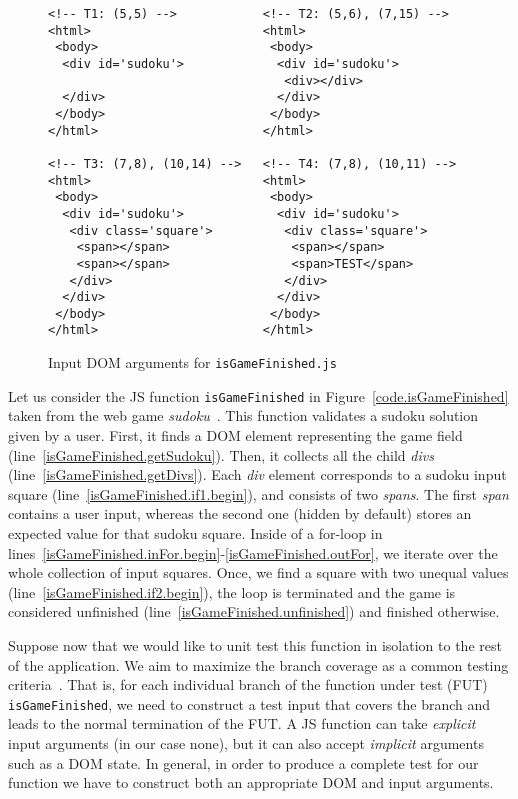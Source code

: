 \documentclass[sigconf,review]{acmart}
\begin{document}
\begin{figure}[t]
  \begin{lstlisting}[style=htmlcssjs, language=HTML5]
<!-- T1: (5,5) -->            <!-- T2: (5,6), (7,15) -->
<html>                        <html>
 <body>                        <body>
  <div id='sudoku'>             <div id='sudoku'>
                                 <div></div>                           
  </div>                        </div> 
 </body>                       </body>    
</html>                       </html>  

<!-- T3: (7,8), (10,14) -->   <!-- T4: (7,8), (10,11) -->
<html>                        <html>
 <body>                        <body>
  <div id='sudoku'>             <div id='sudoku'>
   <div class='square'>          <div class='square'>
    <span></span>                 <span></span> 
    <span></span>                 <span>TEST</span>
   </div>                        </div> 
  </div>                        </div>
 </body>                       </body>
</html>                       </html>
  \end{lstlisting}
  \caption{Input DOM arguments for \texttt{isGameFinished.js}}
  \label{fig.isGameFinished.tests}
\end{figure}

Let us consider the JS function \texttt{isGameFinished} in Figure~\ref{code.isGameFinished} taken from the web game \emph{sudoku}~\cite{sudoku}. This function validates a sudoku solution given by a user. First, it finds a DOM element representing the game field (line~\ref{isGameFinished.getSudoku}). Then, it collects all the child \emph{divs} (line~\ref{isGameFinished.getDivs}). Each \emph{div} element corresponds to a sudoku input square (line~\ref{isGameFinished.if1.begin}), and consists of two \emph{spans}. The first \emph{span} contains a user input, whereas the second one (hidden by default) stores an expected value for that sudoku square. Inside of a for-loop in lines~\ref{isGameFinished.inFor.begin}-\ref{isGameFinished.outFor}, we iterate over the whole collection of input squares. Once, we find a square with two unequal values (line~\ref{isGameFinished.if2.begin}), the loop is terminated and the game is considered unfinished (line~\ref{isGameFinished.unfinished}) and finished otherwise.

Suppose now that we would like to unit test this function in isolation to the rest of the application. We aim to maximize the branch coverage as a common testing criteria~\cite{zhu1997software}. That is, for each individual branch of the function under test (FUT) \texttt{isGameFinished}, we need to construct a test input that covers the branch and leads to the normal termination of the FUT. A JS function can take \emph{explicit} input arguments (in our case none), but it can also accept \emph{implicit} arguments such as a DOM state. In general, in order to produce a complete test for our function we have to construct both an appropriate DOM and input arguments.   
\end{document}
